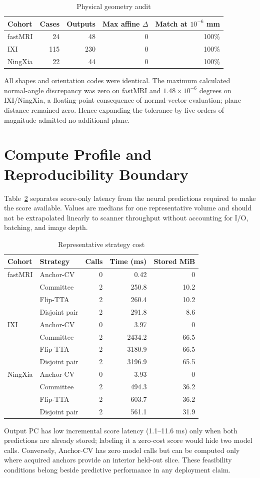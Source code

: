 \documentclass[journal,10pt]{IEEEtran}
\begin{document}
\begin{table}[t]
\caption{Physical geometry audit}
\label{tab:geometry}\centering
\begin{tabular}{lrrrr}
\toprule
Cohort&Cases&Outputs&Max affine $\Delta$&Match at $10^{-6}$ mm\\
\midrule
fastMRI&24&48&0&100\%\\
IXI&115&230&0&100\%\\
NingXia&22&44&0&100\%\\
\bottomrule
\end{tabular}
\end{table}

All shapes and orientation codes were identical. The maximum calculated normal-angle discrepancy was zero on fastMRI and $1.48\times10^{-6}$ degrees on IXI/NingXia, a floating-point consequence of normal-vector evaluation; plane distance remained zero. Hence expanding the tolerance by five orders of magnitude admitted no additional plane.

\section{Compute Profile and Reproducibility Boundary}
Table~\ref{tab:compute} separates score-only latency from the neural predictions required to make the score available. Values are medians for one representative volume and should not be extrapolated linearly to scanner throughput without accounting for I/O, batching, and image depth.

\begin{table}[t]
\caption{Representative strategy cost}
\label{tab:compute}\centering
\begin{tabular}{llrrr}
\toprule
Cohort&Strategy&Calls&Time (ms)&Stored MiB\\
\midrule
fastMRI&Anchor-CV&0&0.42&0\\
&Committee&2&250.8&10.2\\
&Flip-TTA&2&260.4&10.2\\
&Disjoint pair&2&291.8&8.6\\
IXI&Anchor-CV&0&3.97&0\\
&Committee&2&2434.2&66.5\\
&Flip-TTA&2&3180.9&66.5\\
&Disjoint pair&2&3196.9&65.5\\
NingXia&Anchor-CV&0&3.93&0\\
&Committee&2&494.3&36.2\\
&Flip-TTA&2&603.7&36.2\\
&Disjoint pair&2&561.1&31.9\\
\bottomrule
\end{tabular}
\end{table}

Output PC has low incremental score latency (1.1--11.6 ms) only when both predictions are already stored; labeling it a zero-cost score would hide two model calls. Conversely, Anchor-CV has zero model calls but can be computed only where acquired anchors provide an interior held-out slice. These feasibility conditions belong beside predictive performance in any deployment claim.



\end{document}
